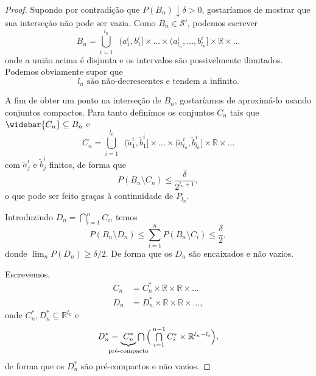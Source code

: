 \documentclass[reqno]{article}
\newcommand*\1{\mathds{1}}
\newcommand{\mcup}{\textstyle \bigcup\limits}
\newcommand{\mcap}{\textstyle \bigcap\limits}
\def\clap#1{\hbox to 0pt{\hss#1\hss}}
\def\mathclap{\mathpalette\mathclapinternal}
\def\mathclapinternal#1#2{\clap{$\mathsurround=0pt#1{#2}$}}
\begin{document}
\begin{proof}
  Supondo por contradição que $P(B_n) \downarrow \delta > 0$, gostaríamos de mostrar que sua interseção não pode ser vazia.
  Como $B_n \in \mathcal{S}'$, podemos escrever
  \begin{equation}
    B_n = \mcup_{i=1}^{l_n} \;\; (a_1^i, b_1^i] \times \dots \times (a_{l_n}^i, \dots, b_{l_n}^i] \times \mathbb{R} \times \dots
  \end{equation}
  onde a união acima é disjunta e os intervalos são possivelmente ilimitados.
  Podemos obviamente supor que
  \begin{equation}
    \label{e:l_n_monotona}
    \text{$l_n$ são não-decrescentes e tendem a infinito.}
  \end{equation}

  A fim de obter um ponto na interseção de $B_n$, gostaríamos de aproximá-lo usando conjuntos compactos.
  Para tanto definimos os conjuntos $C_n$ tais que $\widebar{C_n} \subseteq B_n$ e
  \begin{equation}
    C_n = \mcup_{i=1}^{l_n} \;\; \big(\tilde a_1^i, \tilde b_1^i\big] \times \dots \times \big(\tilde a_{l_n}^i, \tilde b_{l_n}^i\big] \times \mathbb{R} \times \dots
  \end{equation}
  com $\tilde a_j^i$ e $\tilde b_j^i$ finitos, de forma que
  \begin{equation}
    P(B_n \setminus C_n) \leq \frac{\delta}{2^{l_n + 1}},
  \end{equation}
  o que pode ser feito graças à continuidade de $P_{l_n}$.


  Introduzindo $D_n = \bigcap_{i=1}^n C_i$, temos
  \begin{equation}
    P(B_n \setminus D_n) \leq \sum_{i=1}^n P(B_n \setminus C_i) \leq \frac{\delta}2,
  \end{equation}
  donde $\lim_n P(D_n) \geq \delta/2$.
  De forma que os $D_n$ são encaixados e não vazios.

  Escrevemos,
  \begin{equation}
    \begin{split}
      C_n & = C_n^* \times \mathbb{R} \times \mathbb{R} \times \dots\\
      D_n & = D_n^* \times \mathbb{R} \times \mathbb{R} \times \dots,
    \end{split}
  \end{equation}
  onde $C_n^*, D_n^* \subseteq \mathbb{R}^{l_n}$ e
  \begin{equation}
    D_n^* = \underbrace{C_n^*}_{\mathclap{\text{pré-compacto}}} \mcap \Big( \mcap_{i=1}^{n-1} C_i^* \times \mathbb{R}^{l_n - l_i} \Big),
  \end{equation}
  de forma que os $D_n^*$ são pré-compactos e não vazios.


\end{proof}
\end{document}
